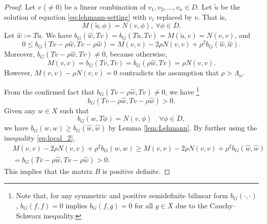 \documentclass[10pt,a4paper]{amsart}
\begin{document}
\begin{proof}
Let $v$ ($\neq 0$) be a linear combination of $v_1, v_2, \ldots, v_n \in D$. 
Let $\tilde{u}$ be the solution of equation \eqref{eq:lehmann-setting} with $v_i$ replaced by $v$. That is,
\begin{equation}
	\label{eq:local_B_positive_1}
M(\tilde{u}, \phi)=N(v,\phi), ~\forall \phi \in D.
\end{equation}
Let $\widehat{w} := T\tilde{u}$. We have $b_G(\widehat{w}, Tv)= b_G(T\tilde{u}, Tv)=
M(\tilde{u}, v)=N(v,v)$, and 
\[
0 \leq b_G(Tv - \rho \widehat{w}, Tv - \rho \widehat{w}) = M(v,v) - 2\rho N(v,v) + \rho^2 b_G(\widehat{w}, \widehat{w}).
\]
Moreover,  $b_G(Tv - \rho \widehat{w}, Tv)  \ne 0$, because otherwise, 
$$
M(v,v)=b_G(Tv, Tv)=b_G(\rho \widehat{w}, Tv)
=\rho N(v,v).
$$ 
However, $M(v,v) - \rho N(v,v) =0$  contradicts the assumption that $\rho > \Lambda_n$.

From the confirmed  fact that $b_G(Tv - \rho \widehat{w}, Tv)  \ne 0$, we have
\footnote{Note that, for any symmetric and positive semidefinite bilinear form $b_G(\cdot, \cdot)$,  $b_G(f,f)=0$ implies $b_G(f,g)=0$ for all $g\in X$ due to the Cauchy--Schwarz inequality.}
\begin{equation}
	\label{eq:local_2}
b_G(Tv - \rho \widehat{w}, Tv - \rho \widehat{w}) > 0.
\end{equation}
%
%
Given any $w\in X$   such that
\[
b_G(w, T\phi) = N(v, \phi) \quad \forall \phi \in D,
\]
we have 
 $b_G(w, w) \geq b_G(\widehat{w}, \widehat{w})$ by Lemma \ref{lem:Lehmann}. 
By further using the inequality \eqref{eq:local_2}, 
\begin{align*}
& M(v,v) - 2\rho N(v,v) + \rho^2 b_G(w, w) \ge M(v,v) - 2\rho N(v,v) + \rho^2 b_G(\widehat{w}, \widehat{w}) &\\
& = b_G(Tv - \rho \widehat{w}, Tv - \rho \widehat{w}) > 0.&	
\end{align*}
This implies that the matrix $B$ is positive definite.
\end{proof}
\end{document}
